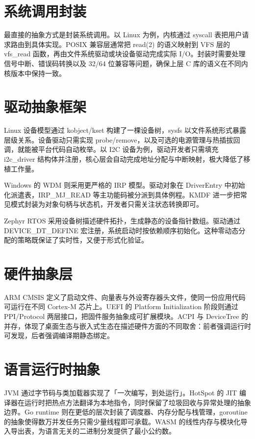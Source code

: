 \section{系统调用封装}
最直接的抽象方式是封装系统调用。以 Linux 为例，内核通过 syscall 表把用户请求路由到具体实现。POSIX 兼容层通常把 read(2) 的语义映射到 VFS 层的 vfs\_{}read 函数，再由文件系统驱动或块设备驱动完成实际 I/O。封装时需要处理信号中断、错误码转换以及 32/64 位兼容等问题，确保上层 C 库的语义在不同内核版本中保持一致。\par
\section{驱动抽象框架}
Linux 设备模型通过 kobject/kset 构建了一棵设备树，sysfs 以文件系统形式暴露层级关系。设备驱动只需实现 probe/remove，以及可选的电源管理与热插拔回调，就能被平台代码自动枚举。以 I2C 设备为例，驱动开发者只需填充 i2c\_{}driver 结构体并注册，核心层会自动完成地址分配与中断映射，极大降低了移植工作量。\par
Windows 的 WDM 则采用更严格的 IRP 模型。驱动对象在 DriverEntry 中初始化派遣表，IRP\_{}MJ\_{}READ 等主功能码被分派到具体例程。KMDF 进一步把常见模式封装为对象句柄与状态机，开发者只需关注状态转换即可。\par
Zephyr RTOS 采用设备树描述硬件拓扑，生成静态的设备指针数组。驱动通过 DEVICE\_{}DT\_{}DEFINE 宏注册，系统启动时按依赖顺序初始化。这种零动态分配的策略既保证了实时性，又便于形式化验证。\par
\section{硬件抽象层}
ARM CMSIS 定义了启动文件、向量表与外设寄存器头文件，使同一份应用代码可运行在不同 Cortex-M 芯片上。UEFI 的 Platform Initialization 阶段则通过 PPI/Protocol 两层接口，把固件服务抽象成可扩展模块。ACPI 与 DeviceTree 的并存，体现了桌面生态与嵌入式生态在描述硬件方面的不同取舍：前者强调运行时可发现，后者强调编译期静态绑定。\par
\section{语言运行时抽象}
JVM 通过字节码与类加载器实现了「一次编写，到处运行」。HotSpot 的 JIT 编译器在运行时把热点方法翻译为本地指令，同时保留了垃圾回收与异常处理的抽象边界。Go runtime 则在更低的层次封装了调度器、内存分配与栈管理，goroutine 的抽象使得数万并发任务只需少量线程即可承载。WASM 的线性内存与模块化导入导出表，为语言无关的二进制分发提供了最小公约数。\par
